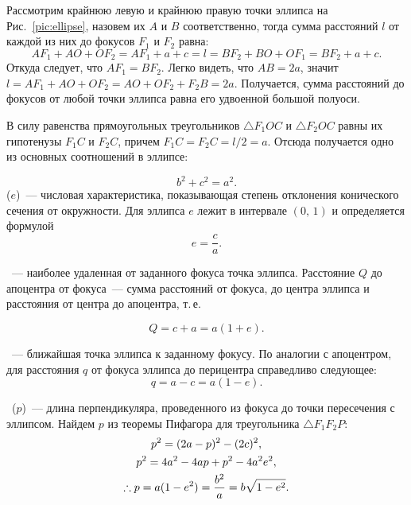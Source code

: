 Рассмотрим крайнюю левую и крайнюю правую точки эллипса на Рис.~\ref{pic:ellipse}, назовем их $A$ и $B$ соответственно, тогда сумма расстояний $l$ от каждой из них до фокусов $F_1$ и $F_2$ равна:
\begin{equation*}
    AF_1 + AO + OF_2 = AF_1 + a + c = l = BF_2 + BO + OF_1 = BF_2 + a + c.
\end{equation*}
Откуда следует, что $A F_1 = B F_2$. Легко видеть, что $AB = 2a$, значит $l = AF_1 + AO + OF_2 = AO + OF_2 + F_2B = 2a$. Получается, сумма расстояний до фокусов от любой точки эллипса равна его удвоенной большой полуоси.

В силу равенства прямоугольных треугольников $\triangle F_1 O C$ и $\triangle F_2 O C$ равны их гипотенузы $F_1C$ и $F_2C$, причем $F_1C= F_2C = l/2 = a$. Отсюда получается одно из основных соотношений в эллипсе:

\begin{equation}
    b^2 + c^2 = a^2.
\end{equation}
 ($e$)~--- числовая
характеристика, показывающая степень отклонения конического сечения от окружности. Для эллипса $e$ лежит в интервале $(0, \, 1)$ и
определяется формулой
\begin{equation}
    e = \frac{c}{a}.
\end{equation}

~--- наиболее удаленная от заданного фокуса точка эллипса. Расстояние $Q$ до апоцентра от фокуса~--- сумма расстояний от фокуса, до центра эллипса и расстояния от центра до апоцентра, т.\,е.

\begin{equation}
    Q = c + a = a (1 + e).
\end{equation}

~--- ближайшая точка эллипса к заданному фокусу. По аналогии с апоцентром, для расстояния $q$ от фокуса эллипса до перицентра справедливо следующее:
\begin{equation}
    q = a - c = a (1 - e).
\end{equation}

~($p$)~--- длина перпендикуляра, проведенного из фокуса до точки пересечения с эллипсом. Найдем $p$ из теоремы Пифагора для треугольника $\triangle F_1 F_2 P$:
\begin{gather}
    p^2 = (2a - p)^2 - (2c)^2, \notag\\
    p^2 =  4a^2 - 4ap + p^2 - 4a^2e^2,\notag\\
    \therefore p = a (1 - e^2) = \frac{b^2}{a} = b \sqrt{1 - e^2}.
\end{gather}


